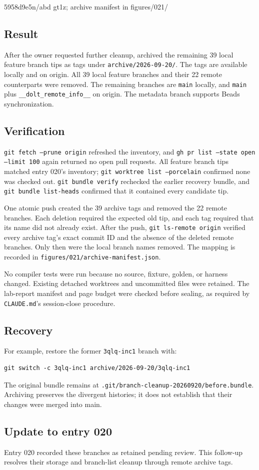 %
  {5958d9e5}{n/a}{bd gt1z; archive manifest in figures/021/}

\subsection*{Result}
After the owner requested further cleanup,  archived the remaining
39 local feature branch tips as tags under
\texttt{archive/2026-09-20/}. The tags are available locally and on origin.
All 39 local feature branches and their 22 remote counterparts were removed.
The remaining branches are \texttt{main} locally, and \texttt{main} plus
\texttt{\_\_dolt\_remote\_info\_\_} on origin. The metadata branch supports
Beads synchronization.

\subsection*{Verification}
\texttt{git fetch --prune origin} refreshed the inventory, and
\texttt{gh pr list --state open --limit 100} again returned no open pull
requests. All feature branch tips matched entry 020's inventory;
\texttt{git worktree list --porcelain} confirmed none was checked out.
\texttt{git bundle verify} rechecked the earlier recovery bundle, and
\texttt{git bundle list-heads} confirmed that it contained every candidate tip.

One atomic push created the 39 archive tags and removed the 22 remote
branches. Each deletion required the expected old tip, and each tag required
that its name did not already exist. After the push,
\texttt{git ls-remote origin} verified every archive tag's exact commit ID
and the absence of the deleted remote branches. Only then were the local
branch names removed. The mapping is recorded in
\texttt{figures/021/archive-manifest.json}.

No compiler tests were run because no source, fixture, golden, or harness
changed. Existing detached worktrees and uncommitted files were retained.
The lab-report manifest and page budget were checked before sealing, as
required by \texttt{CLAUDE.md}'s session-close procedure.

\subsection*{Recovery}
For example, restore the former \texttt{3qlq-inc1} branch with:
\begin{verbatim}
git switch -c 3qlq-inc1 archive/2026-09-20/3qlq-inc1
\end{verbatim}
The original bundle remains at
\texttt{.git/branch-cleanup-20260920/before.bundle}.
Archiving preserves the divergent histories; it does not establish that
their changes were merged into main.

\subsection*{Update to entry 020}
Entry 020 recorded these branches as retained pending review. This follow-up
resolves their storage and branch-list cleanup through remote archive tags.
